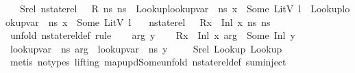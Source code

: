 \begin{isabellebody}
\ \ \ Srel{\isacharcolon}{\kern0pt}\ {\isachardoublequoteopen}nstate{\isacharunderscore}{\kern0pt}rel\ {\isasymLambda}\ {\isasymLambda}{\isacharprime}{\kern0pt}\ R\ ns{}\ ns{}{\isachardoublequoteclose}\ \ Lookup{}{\isacharcolon}{\kern0pt}{\isachardoublequoteopen}lookup{\isacharunderscore}{\kern0pt}var\ {\isasymLambda}\ ns{}\ x\ {\isacharequal}{\kern0pt}\ Some\ {\isacharparenleft}{\kern0pt}LitV\ l{\isacharparenright}{\kern0pt}{\isachardoublequoteclose}\ \ Lookup{}{\isacharcolon}{\kern0pt}{\isachardoublequoteopen}lookup{\isacharunderscore}{\kern0pt}var\ {\isasymLambda}{\isacharprime}{\kern0pt}\ ns{}\ x{}\ {\isacharequal}{\kern0pt}\ Some\ {\isacharparenleft}{\kern0pt}LitV\ l{\isacharparenright}{\kern0pt}{\isachardoublequoteclose}\isanewline
\ \ \ {\isachardoublequoteopen}nstate{\isacharunderscore}{\kern0pt}rel\ {\isasymLambda}\ {\isasymLambda}{\isacharprime}{\kern0pt}\ {\isacharparenleft}{\kern0pt}R{\isacharparenleft}{\kern0pt}x\ {\isasymmapsto}\ {\isacharparenleft}{\kern0pt}Inl\ x{}{\isacharparenright}{\kern0pt}{\isacharparenright}{\kern0pt}{\isacharparenright}{\kern0pt}\ ns{}\ ns{}{\isachardoublequoteclose}\isanewline
%
\isadelimproof
%
\endisadelimproof
%
\isatagproof
{}\isamarkupfalse%
\ {\isacharparenleft}{\kern0pt}unfold\ nstate{\isacharunderscore}{\kern0pt}rel{\isacharunderscore}{\kern0pt}def{\isacharcomma}{\kern0pt}\ rule{\isacharplus}{\kern0pt}{\isacharparenright}{\kern0pt}\isanewline
\ \ \isamarkupfalse%
\ arg\ y\isanewline
\ \ \isamarkupfalse%
\ {\isachardoublequoteopen}{\isacharparenleft}{\kern0pt}R{\isacharparenleft}{\kern0pt}x\ {\isasymmapsto}\ {\isacharparenleft}{\kern0pt}Inl\ x{}{\isacharparenright}{\kern0pt}{\isacharparenright}{\kern0pt}{\isacharparenright}{\kern0pt}\ arg\ {\isacharequal}{\kern0pt}\ Some\ {\isacharparenleft}{\kern0pt}Inl\ y{\isacharparenright}{\kern0pt}{\isachardoublequoteclose}\isanewline
\ \ \isamarkupfalse%
\ {\isachardoublequoteopen}lookup{\isacharunderscore}{\kern0pt}var\ {\isasymLambda}\ ns{}\ arg\ {\isacharequal}{\kern0pt}\ lookup{\isacharunderscore}{\kern0pt}var\ {\isasymLambda}{\isacharprime}{\kern0pt}\ ns{}\ y{\isachardoublequoteclose}\isanewline
\ \ \ \isamarkupfalse%
\ Srel\ Lookup{}\ Lookup{}\isanewline
\ \ \ \isamarkupfalse%
\ {\isacharparenleft}{\kern0pt}metis\ {\isacharparenleft}{\kern0pt}no{\isacharunderscore}{\kern0pt}types{\isacharcomma}{\kern0pt}\ lifting{\isacharparenright}{\kern0pt}\ map{\isacharunderscore}{\kern0pt}upd{\isacharunderscore}{\kern0pt}Some{\isacharunderscore}{\kern0pt}unfold\ nstate{\isacharunderscore}{\kern0pt}rel{\isacharunderscore}{\kern0pt}def\ sum{\isachardot}{\kern0pt}inject{\isacharparenleft}{\kern0pt}{}{\isacharparenright}{\kern0pt}{\isacharparenright}{\kern0pt}\isanewline

\end{isabellebody}
